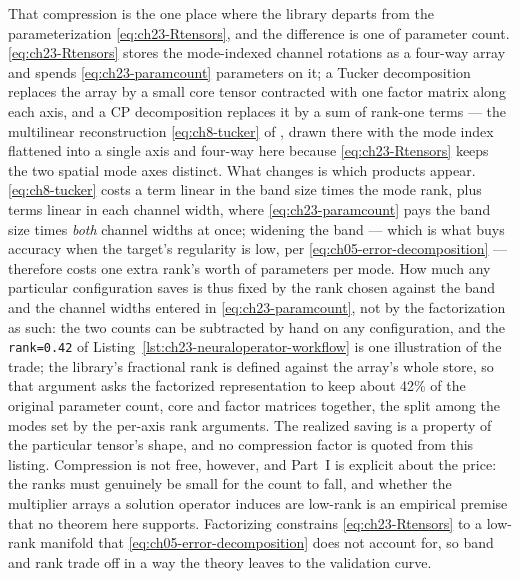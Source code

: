 That compression is the one place where the library departs from the
parameterization \eqref{eq:ch23-Rtensors}, and the difference is one of
parameter count. \eqref{eq:ch23-Rtensors} stores the mode-indexed channel
rotations as a four-way array and spends \eqref{eq:ch23-paramcount} parameters
on it; a Tucker decomposition replaces the array by a small core tensor
contracted with one factor matrix along each axis, and a
CP decomposition replaces it by a sum of rank-one terms
--- the multilinear reconstruction \eqref{eq:ch8-tucker} of
, drawn there with
the mode index flattened into a single axis and four-way here because
\eqref{eq:ch23-Rtensors} keeps the two spatial mode axes distinct. What changes
is which products appear. \eqref{eq:ch8-tucker} costs a term linear in the band
size times the mode rank, plus terms linear in each channel width, where
\eqref{eq:ch23-paramcount} pays the band size times \emph{both} channel widths
at once; widening the band --- which is what buys accuracy when the target's
regularity is low, per \eqref{eq:ch05-error-decomposition} --- therefore costs
one extra rank's worth of parameters per mode. How much any particular
configuration saves
is thus fixed by the rank chosen against the band and the channel widths entered
in \eqref{eq:ch23-paramcount}, not by the factorization as such: the two counts
can be subtracted by hand on any configuration, and the \texttt{rank=0.42} of
Listing~\ref{lst:ch23-neuraloperator-workflow} is one illustration of the
trade; the library's fractional rank is defined against the array's whole store, so
that argument asks the factorized representation to keep about 42\% of the original
parameter count, core and factor matrices together, the split among the modes set by
the per-axis rank arguments. The realized saving is a property of the particular
tensor's shape, and no compression factor is quoted from this listing. Compression is not free, however, and Part~I is explicit about
the price: the ranks must genuinely be small for the count to fall, and whether
the multiplier arrays a solution operator induces are low-rank is an empirical
premise that no theorem here supports. Factorizing constrains
\eqref{eq:ch23-Rtensors} to a low-rank manifold that
\eqref{eq:ch05-error-decomposition} does not account for, so band and rank trade
off in a way the theory leaves to the validation curve.

